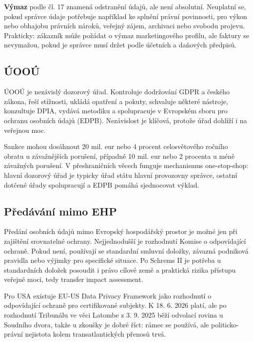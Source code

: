 \documentclass[11pt,a4paper]{article}
\begin{document}
\textbf{Výmaz} podle čl. 17 znamená odstranění údajů, ale není absolutní. Neuplatní se, pokud správce údaje potřebuje například ke splnění právní povinnosti, pro výkon nebo obhajobu právních nároků, veřejný zájem, archivaci nebo svobodu projevu. Prakticky: zákazník může požádat o výmaz marketingového profilu, ale faktury se nevymažou, pokud je správce musí držet podle účetních a daňových předpisů.

\subsection*{ÚOOÚ}
ÚOOÚ je nezávislý dozorový úřad. Kontroluje dodržování GDPR a českého zákona, řeší stížnosti, ukládá opatření a pokuty, schvaluje některé nástroje, konzultuje DPIA, vydává metodiku a spolupracuje v Evropském sboru pro ochranu osobních údajů (EDPB). Nezávislost je klíčová, protože úřad dohlíží i na veřejnou moc.

Sankce mohou dosáhnout 20 mil. eur nebo 4 procent celosvětového ročního obratu u závažnějších porušení, případně 10 mil. eur nebo 2 procenta u méně závažných porušení. V přeshraničních věcech funguje mechanismus one-stop-shop: hlavní dozorový úřad je typicky úřad státu hlavní provozovny správce, ostatní dotčené úřady spolupracují a EDPB pomáhá sjednocovat výklad.

\subsection*{Předávání mimo EHP}
Předání osobních údajů mimo Evropský hospodářský prostor je možné jen při zajištění srovnatelné ochrany. Nejjednodušší je rozhodnutí Komise o odpovídající ochraně. Pokud není, používají se standardní smluvní doložky, závazná podniková pravidla nebo výjimky pro specifické situace. Po Schrems II je potřeba u standardních doložek posoudit i právo cílové země a praktická rizika přístupu veřejné moci, tedy transfer impact assessment.

Pro USA existuje EU-US Data Privacy Framework jako rozhodnutí o odpovídající ochraně pro certifikované subjekty. K 18. 6. 2026 platí, ale po rozhodnutí Tribunálu ve věci Latombe z 3. 9. 2025 běží odvolací rovina u Soudního dvora, takže u zkoušky je dobré říct: rámec se používá, ale politicko-právní nejistota kolem transatlantických přenosů trvá.
\end{document}
